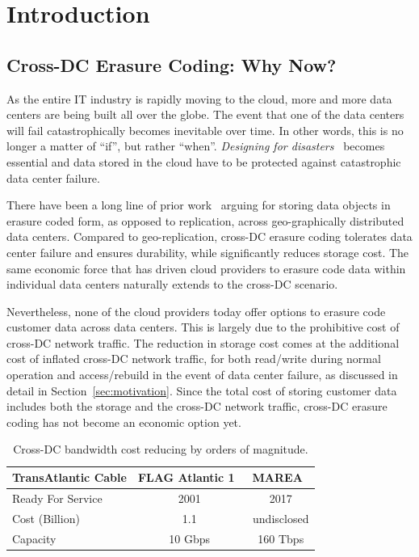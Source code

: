 \section{Introduction}

\subsection{Cross-DC Erasure Coding: Why Now?}

As the entire IT industry is rapidly moving to the cloud, more and more data centers are being built all over the globe. The event that one of the data centers will fail catastrophically becomes inevitable over time. In other words, this is no longer a matter of ``if'', but rather ``when''. {\em Designing for disasters}~\cite{bib:disasters} becomes essential and data stored in the cloud have to be protected against catastrophic data center failure.

There have been a long line of prior work~\cite{OceanStore, bib:pond, Bowers:2009:HHI:1653662.1653686, Abu-Libdeh:2010:RCC:1807128.1807165, hu2012nccloud} arguing for storing data objects in erasure coded form, as opposed to replication, across geo-graphically distributed data centers. Compared to geo-replication, cross-DC erasure coding tolerates data center failure and ensures durability, while significantly reduces storage cost. The same economic force that has driven cloud providers to erasure code data within individual data centers naturally extends to the cross-DC scenario.

Nevertheless, none of the cloud providers today offer options to erasure code customer data across data centers. This is largely due to the prohibitive cost of cross-DC network traffic. The reduction in storage cost comes at the additional cost of inflated cross-DC network traffic, for both read/write during normal operation and access/rebuild in the event of data center failure, as discussed in detail in Section~\ref{sec:motivation}. Since the total cost of storing customer data includes both the storage and the cross-DC network traffic, cross-DC erasure coding has not become an economic option yet.

\begin{table}[thp]
\centering
\small
\begin{tabular}{|l|c|c|}
\hline
TransAtlantic Cable             & FLAG Atlantic 1~\cite{bib:FA-1}   & MAREA~\cite{bib:MAREA1, bib:MAREA2}
\\ \hline \hline
Ready For Service               & 2001                              & 2017
\\ \hline
Cost (Billion)                  & 1.1                               & undisclosed
\\ \hline
Capacity                        & 10 Gbps                           & 160 Tbps
\\ \hline \hline
\end{tabular}
\caption{Cross-DC bandwidth cost reducing by orders of magnitude.}
\label{tab:mears}
\end{table}

